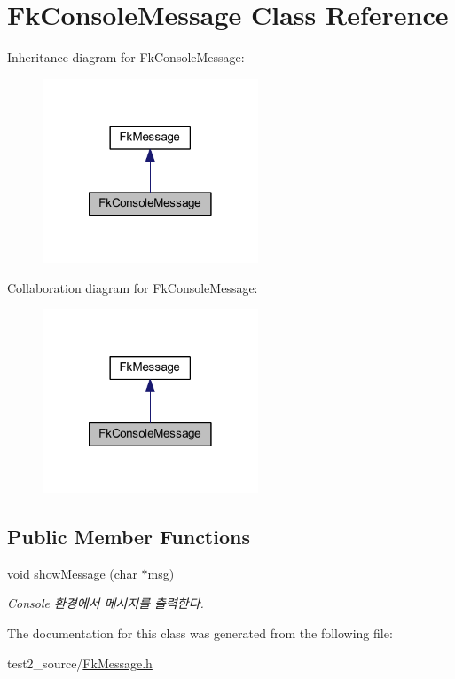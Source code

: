 \hypertarget{class_fk_console_message}{}\section{Fk\+Console\+Message Class Reference}
\label{class_fk_console_message}


Inheritance diagram for Fk\+Console\+Message\+:
\nopagebreak
\begin{figure}[H]
\begin{center}
\leavevmode
\includegraphics[width=182pt]{class_fk_console_message__inherit__graph}
\end{center}
\end{figure}


Collaboration diagram for Fk\+Console\+Message\+:
\nopagebreak
\begin{figure}[H]
\begin{center}
\leavevmode
\includegraphics[width=182pt]{class_fk_console_message__coll__graph}
\end{center}
\end{figure}
\subsection*{Public Member Functions}
\begin{DoxyCompactItemize}
\item 
\hypertarget{class_fk_console_message_acf960136bbb9ee825a75cdea8d3225bc}{}void \hyperlink{class_fk_console_message_acf960136bbb9ee825a75cdea8d3225bc}{show\+Message} (char $\ast$msg)\label{class_fk_console_message_acf960136bbb9ee825a75cdea8d3225bc}

\begin{DoxyCompactList}\small\item\em Console 환경에서 메시지를 출력한다. \end{DoxyCompactList}\end{DoxyCompactItemize}


The documentation for this class was generated from the following file\+:\begin{DoxyCompactItemize}
\item 
test2\+\_\+source/\hyperlink{_fk_message_8h}{Fk\+Message.\+h}\end{DoxyCompactItemize}
